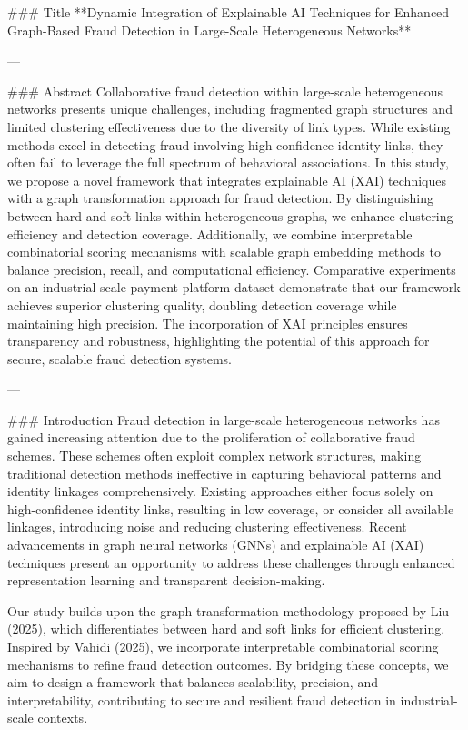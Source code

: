### Title  
**Dynamic Integration of Explainable AI Techniques for Enhanced Graph-Based Fraud Detection in Large-Scale Heterogeneous Networks**

---

### Abstract  
Collaborative fraud detection within large-scale heterogeneous networks presents unique challenges, including fragmented graph structures and limited clustering effectiveness due to the diversity of link types. While existing methods excel in detecting fraud involving high-confidence identity links, they often fail to leverage the full spectrum of behavioral associations. In this study, we propose a novel framework that integrates explainable AI (XAI) techniques with a graph transformation approach for fraud detection. By distinguishing between hard and soft links within heterogeneous graphs, we enhance clustering efficiency and detection coverage. Additionally, we combine interpretable combinatorial scoring mechanisms with scalable graph embedding methods to balance precision, recall, and computational efficiency. Comparative experiments on an industrial-scale payment platform dataset demonstrate that our framework achieves superior clustering quality, doubling detection coverage while maintaining high precision. The incorporation of XAI principles ensures transparency and robustness, highlighting the potential of this approach for secure, scalable fraud detection systems.

---

### Introduction  
Fraud detection in large-scale heterogeneous networks has gained increasing attention due to the proliferation of collaborative fraud schemes. These schemes often exploit complex network structures, making traditional detection methods ineffective in capturing behavioral patterns and identity linkages comprehensively. Existing approaches either focus solely on high-confidence identity links, resulting in low coverage, or consider all available linkages, introducing noise and reducing clustering effectiveness. Recent advancements in graph neural networks (GNNs) and explainable AI (XAI) techniques present an opportunity to address these challenges through enhanced representation learning and transparent decision-making.

Our study builds upon the graph transformation methodology proposed by Liu (2025), which differentiates between hard and soft links for efficient clustering. Inspired by Vahidi (2025), we incorporate interpretable combinatorial scoring mechanisms to refine fraud detection outcomes. By bridging these concepts, we aim to design a framework that balances scalability, precision, and interpretability, contributing to secure and resilient fraud detection in industrial-scale contexts.


